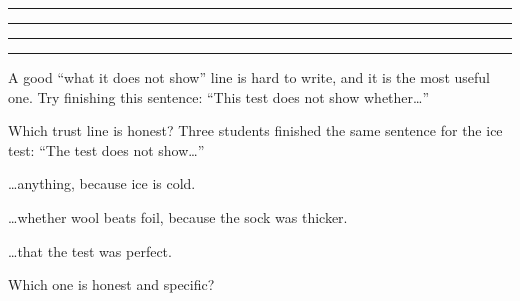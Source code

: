 \trust{\par\vspace{4pt}\rule{\linewidth}{0.4pt}\par\vspace{10pt}\rule{\linewidth}{0.4pt}\par\vspace{6pt}}
{\par\vspace{4pt}\rule{\linewidth}{0.4pt}\par\vspace{10pt}\rule{\linewidth}{0.4pt}\par\vspace{6pt}}
{\par\vspace{4pt}\rule{\linewidth}{0.4pt}\par\vspace{10pt}\rule{\linewidth}{0.4pt}\par\vspace{6pt}}

\begin{multix}[ok]\multixbot[ok]\tcblower
A good ``what it does not show'' line is hard to write, and it is the most useful one. Try finishing this sentence: ``This test does not show whether\ldots''
\end{multix}

\begin{puzzle}{Which trust line is honest?}
Three students finished the same sentence for the ice test: ``The test does not show\ldots''
\begin{description}[leftmargin=1.6em,itemsep=0.3em,style=sameline]
\item[A] \ldots anything, because ice is cold.
\item[B] \ldots whether wool beats foil, because the sock was thicker.
\item[C] \ldots that the test was perfect.
\end{description}
Which one is honest and specific? \wline[1.5cm]
\end{puzzle}
\clearpage
